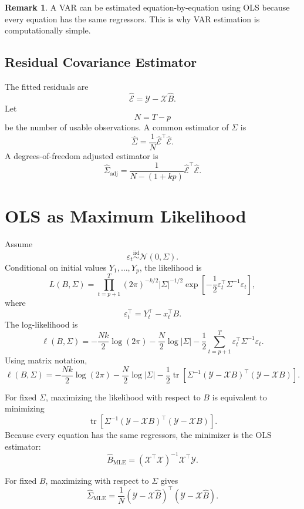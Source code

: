 \documentclass[12pt,oneside]{book}
\numberwithin{equation}{section}
\theoremstyle{definition}
\newtheorem{remark}{Remark}[section]
\theoremstyle{plain}
\theoremstyle{remark}
\newcommand{\iid}{\overset{\text{iid}}{\sim}}
\newcommand{\tr}{\operatorname{tr}}
\newcommand{\Normal}{\mathcal{N}}
\begin{document}
\begin{remark}
A VAR can be estimated equation-by-equation using OLS because every equation has the same regressors. This is why VAR estimation is computationally simple.
\end{remark}

\subsection{Residual Covariance Estimator}

The fitted residuals are
\[
\widehat{\mathcal{E}}
=
\mathcal{Y}-\mathcal{X}\widehat{B}.
\]
Let
\[
N=T-p
\]
be the number of usable observations. A common estimator of $\Sigma$ is
\[
\widehat{\Sigma}
=
\frac{1}{N}
\widehat{\mathcal{E}}^\top\widehat{\mathcal{E}}.
\]
A degrees-of-freedom adjusted estimator is
\[
\widehat{\Sigma}_{\mathrm{adj}}
=
\frac{1}{N-(1+kp)}
\widehat{\mathcal{E}}^\top\widehat{\mathcal{E}}.
\]

\section{OLS as Maximum Likelihood}

Assume
\[
\varepsilon_t\iid \Normal(0,\Sigma).
\]
Conditional on initial values $Y_1,\ldots,Y_p$, the likelihood is
\[
L(B,\Sigma)
=
\prod_{t=p+1}^{T}
(2\pi)^{-k/2}
|\Sigma|^{-1/2}
\exp\left[
-\frac{1}{2}
\varepsilon_t^\top\Sigma^{-1}\varepsilon_t
\right],
\]
where
\[
\varepsilon_t^\top=Y_t^\top-x_t^\top B.
\]
The log-likelihood is
\[
\ell(B,\Sigma)
=
-\frac{Nk}{2}\log(2\pi)
-\frac{N}{2}\log|\Sigma|
-\frac{1}{2}
\sum_{t=p+1}^{T}
\varepsilon_t^\top\Sigma^{-1}\varepsilon_t.
\]
Using matrix notation,
\[
\ell(B,\Sigma)
=
-\frac{Nk}{2}\log(2\pi)
-\frac{N}{2}\log|\Sigma|
-\frac{1}{2}
\tr\left[
\Sigma^{-1}
(\mathcal{Y}-\mathcal{X}B)^\top
(\mathcal{Y}-\mathcal{X}B)
\right].
\]

For fixed $\Sigma$, maximizing the likelihood with respect to $B$ is equivalent to minimizing
\[
\tr\left[
\Sigma^{-1}
(\mathcal{Y}-\mathcal{X}B)^\top
(\mathcal{Y}-\mathcal{X}B)
\right].
\]
Because every equation has the same regressors, the minimizer is the OLS estimator:
\[
\widehat{B}_{\mathrm{MLE}}
=
(\mathcal{X}^\top\mathcal{X})^{-1}\mathcal{X}^\top\mathcal{Y}.
\]

For fixed $B$, maximizing with respect to $\Sigma$ gives
\[
\widehat{\Sigma}_{\mathrm{MLE}}
=
\frac{1}{N}
(\mathcal{Y}-\mathcal{X}\widehat{B})^\top
(\mathcal{Y}-\mathcal{X}\widehat{B}).
\]
\end{document}
